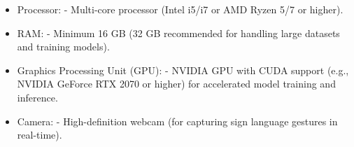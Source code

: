 \begin{itemize}
    \item Processor:
   - Multi-core processor (Intel i5/i7 or AMD Ryzen 5/7 or higher).

    \item RAM:
   - Minimum 16 GB (32 GB recommended for handling large datasets and training models).


    \item  Graphics Processing Unit (GPU):
   - NVIDIA GPU with CUDA support (e.g., NVIDIA GeForce RTX 2070 or higher) for accelerated model training and inference.



  \item Camera:
   - High-definition webcam (for capturing sign language gestures in real-time).




\end{itemize}
